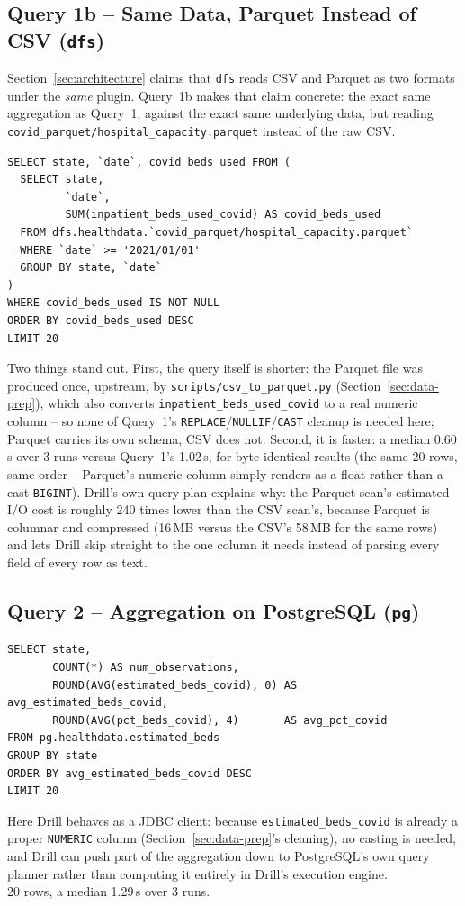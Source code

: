 \documentclass[11pt,a4paper]{article}
\begin{document}
\subsection{Query 1b -- Same Data, Parquet Instead of CSV (\texttt{dfs})}
\label{sec:q1b}
Section~\ref{sec:architecture} claims that \texttt{dfs} reads CSV and Parquet as
two formats under the \emph{same} plugin. Query~1b makes that claim concrete: the
exact same aggregation as Query~1, against the exact same underlying data, but
reading \texttt{covid\_parquet/hospital\_capacity.parquet} instead of the raw CSV.
\begin{lstlisting}[style=sqlstyle]
SELECT state, `date`, covid_beds_used FROM (
  SELECT state,
         `date`,
         SUM(inpatient_beds_used_covid) AS covid_beds_used
  FROM dfs.healthdata.`covid_parquet/hospital_capacity.parquet`
  WHERE `date` >= '2021/01/01'
  GROUP BY state, `date`
)
WHERE covid_beds_used IS NOT NULL
ORDER BY covid_beds_used DESC
LIMIT 20
\end{lstlisting}
Two things stand out. First, the query itself is shorter: the Parquet file was
produced once, upstream, by \texttt{scripts/csv\_to\_parquet.py}
(Section~\ref{sec:data-prep}), which also converts \texttt{inpatient\_beds\_used\_covid}
to a real numeric column -- so none of Query~1's \texttt{REPLACE}/\texttt{NULLIF}/\texttt{CAST}
cleanup is needed here; Parquet carries its own schema, CSV does not. Second, it is
faster: a median 0.60\,s over 3 runs versus Query~1's 1.02\,s, for byte-identical
results (the same 20 rows, same order -- Parquet's numeric column simply renders as
a float rather than a cast \texttt{BIGINT}). Drill's own query plan explains why: the
Parquet scan's estimated I/O cost is roughly 240 times lower than the CSV scan's,
because Parquet is columnar and compressed (16\,MB versus the CSV's 58\,MB for the
same rows) and lets Drill skip straight to the one column it needs instead of
parsing every field of every row as text.
\subsection{Query 2 -- Aggregation on PostgreSQL (\texttt{pg})}
\begin{lstlisting}[style=sqlstyle]
SELECT state,
       COUNT(*) AS num_observations,
       ROUND(AVG(estimated_beds_covid), 0) AS avg_estimated_beds_covid,
       ROUND(AVG(pct_beds_covid), 4)       AS avg_pct_covid
FROM pg.healthdata.estimated_beds
GROUP BY state
ORDER BY avg_estimated_beds_covid DESC
LIMIT 20
\end{lstlisting}
Here Drill behaves as a JDBC client: because \texttt{estimated\_beds\_covid} is
already a proper \texttt{NUMERIC} column (Section~\ref{sec:data-prep}'s cleaning), no
casting is needed, and Drill can push part of the aggregation down to PostgreSQL's
own query planner rather than computing it entirely in Drill's execution engine. \\
20
rows, a median 1.29\,s over 3 runs.
\end{document}

